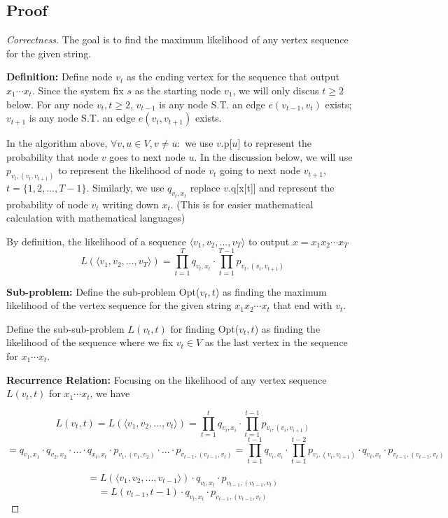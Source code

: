 \documentclass[openany]{article}
\begin{document}
\subsection*{Proof}
\begin{proof}[Correctness]{} The goal is to find the maximum likelihood of any vertex sequence for the given string.

\textbf{Definition:} 
Define node $v_t$ as the ending vertex for the sequence that output $x_1\cdots x_t$. Since the system fix $s$ as the starting node $v_1$, we will only discus $t\geq 2$ below. For any node $v_t, t\geq 2$, $v_{t-1}$ is any node S.T. an edge $e(v_{t-1}, v_{t})$ exists; $v_{t+1}$ is any node S.T. an edge $e(v_t, v_{t+1})$ exists.

In the algorithm above, $\forall v,u\in V, v\neq u:$  we use $v$.p[$u$] to represent the probability that node $v$ goes to next node $u$. In the discussion below, we will use $p_{v_t,(v_t,v_{t+1})}$ to represent the likelihood of node $v_t$ going to next node $v_{t+1}$, $ t=\{1,2,...,T-1\}$. Similarly, we use $q_{v_t,x_t}$ replace $v.$q[x[t]] and represent the probability of node $v_t$ writing down $x_t$. (This is for easier mathematical calculation with mathematical languages)

By definition, the likelihood of a sequence $\langle v_1,v_2,...,v_T \rangle$ to output $x=x_1x_2\cdots x_T$
\[L(\langle v_1,v_2,...,v_T \rangle) = \prod_{t=1}^{T}q_{v_t,x_t} \cdot \prod_{t=1}^{T-1}p_{v_t,(v_t,v_{t+1})}  \]
    
\textbf{Sub-problem:} Define the sub-problem Opt($v_t, t$) as finding the maximum likelihood of the vertex sequence for the given string $x_1x_2\cdots x_t$ that end with $v_t$.

Define the sub-sub-problem $L(v_t,t)$ for finding Opt($v_t,t$) as finding the likelihood of the sequence where we fix $v_t\in V$ as the last vertex in the sequence for $x_1 \cdots x_t$.
    
\textbf{Recurrence Relation:} Focusing on the likelihood of any vertex sequence $L(v_t,t)$ for $x_1\cdots x_t$, we have

\[L(v_t,t)=L(\langle v_1,v_2,...,v_t \rangle)=
\prod_{t=1}^{t}q_{v_i,x_i} \cdot \prod_{t=1}^{t-1}p_{v_i,(v_i,v_{i+1})}\]
\[=q_{v_1,x_1}\cdot q_{v_2,x_2} \cdot ... \cdot q_{x_t, x_t} \cdot p_{v_1,(v_1, v_2)} \cdot ...\cdot p_{v_{t-1},(v_{t-1}, v_{t})}=\prod_{t=1}^{t-1}q_{v_i,x_i} \cdot \prod_{t=1}^{t-2}p_{v_i,(v_i,v_{i+1})} \cdot q_{v_t,x_t} \cdot p_{v_{t-1},(v_{t-1},v_t)}\]


\[= L(\langle v_1,v_2,...,v_{t-1} \rangle)\cdot q_{v_t,x_t} \cdot p_{v_{t-1},(v_{t-1},v_t)} \]
\[= L(v_{t-1}, t-1) \cdot q_{v_t,x_t} \cdot p_{v_{t-1},(v_{t-1},v_t)}  \]



\end{proof}
\end{document}
